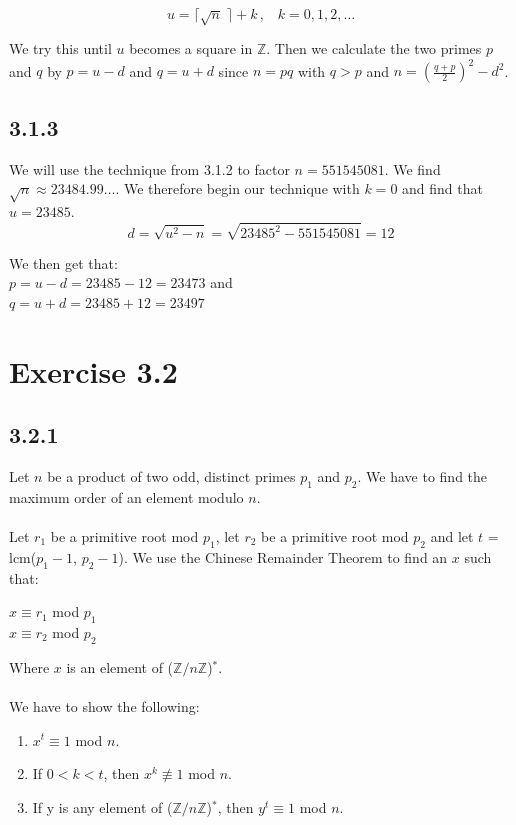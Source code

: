 \documentclass[11pt]{report}
\begin{document}
$$u = \lceil \sqrt{n} \; \rceil + k\,,\;\;\;k =0,1,2,\dots$$

We try this until $u$ becomes a square in $\mathbb{Z}$. Then we calculate the two primes $p$ and $q$ by $p = u - d$ and $q = u + d$ since $n = pq$ with $q > p$ and $n = (\frac{q + p}{2})^2 - d^2$.


\subsection*{3.1.3}
We will use the technique from 3.1.2 to factor $n = 551545081$. We find $\sqrt{n} \approx 23484.99\dots$. We therefore begin our technique with $k = 0$ and find that $u = 23485$.
$$d = \sqrt{u^2 - n} = \sqrt{23485^2 - 551545081} = 12$$

We then get that:\\
$p = u - d = 23485 - 12 = 23473$ and\\
$q = u + d = 23485 + 12 = 23497$\\

\section*{Exercise 3.2}
\subsection*{3.2.1}
Let $n$ be a product of two odd, distinct primes $p_1$ and $p_2$. We have to find the maximum order of an element modulo $n$.\\
\\
Let $r_1$ be a primitive root mod $p_1$, let $r_2$ be a primitive root mod $p_2$ and let $t$ = lcm($p_1 -1$, $p_2 - 1$). We use the Chinese Remainder Theorem to find an $x$ such that:
\begin{center}
$x \equiv r_1$ mod $p_1$\\
$x \equiv r_2$ mod $p_2$
\end{center}
Where $x$ is an element of ($\mathbb{Z} / n\mathbb{Z}$)$^*$.\\
\\
We have to show the following:
\begin{enumerate}
\item $x^t \equiv 1$ mod $n$.
\item If $0 < k < t$, then $x^k \not\equiv 1$ mod $n$.
\item If y is any element of ($\mathbb{Z} / n\mathbb{Z}$)$^*$, then $y^t \equiv 1$ mod $n$.
\end{enumerate}
\end{document}
